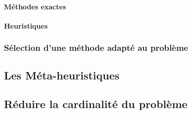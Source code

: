 \paragraph{Méthodes exactes} %
\label{par:methodes_exactes}


\paragraph{Heuristiques} %
\label{par:heuristics}


\subsubsection{Sélection d’une méthode adapté au problème} %
\label{ssub:selection_d_une_methode_adapte_au_probleme}



\subsection{Les Méta-heuristiques} %
\label{sub:les_meta_heuristiques}



\subsection{Réduire la cardinalité du problème} %
\label{sub:reduire_la_cardinalite_du_probleme}





